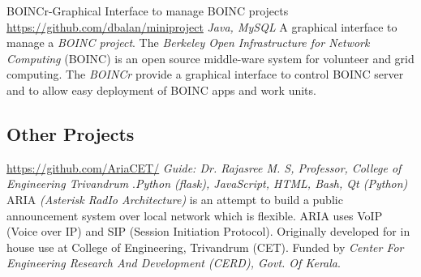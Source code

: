 \documentclass[11pt, a4paper, sans]{moderncv}
\begin{document}
{BOINCr-Graphical Interface to manage BOINC projects}
{\newline \url{https://github.com/dbalan/miniproject}}{}
{\hfill \textit{Java, MySQL}}
{A graphical interface to manage a \textit{BOINC project}. The \textit{Berkeley Open Infrastructure for Network Computing} (BOINC) is an open source middle-ware system for volunteer and grid computing. The \textit{BOINCr} provide a graphical interface to control BOINC server and to allow easy deployment of BOINC apps and work units. \newline}

\fi

\subsection{Other Projects}

{\newline \url{https://github.com/AriaCET/}}
{\newline \textit{Guide: Dr. Rajasree M. S, Professor, College of Engineering Trivandrum}}
{\newline.\hfill \textit{Python (flask), JavaScript, HTML, Bash, Qt (Python)}}
{ARIA \textit{(Asterisk RadIo Architecture)} is an attempt to build a public announcement system over local network which is flexible. ARIA uses VoIP (Voice over IP) and SIP (Session Initiation Protocol). Originally developed for in house use at College of Engineering, Trivandrum (CET). Funded by \textit{Center For Engineering Research And Development (CERD), Govt. Of Kerala}. \newline}



\end{document}
